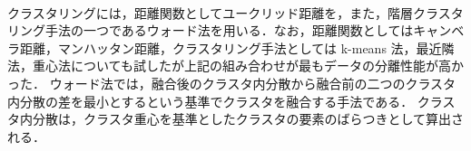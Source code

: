 \documentclass[technicalreport]{ieicej}
\begin{document}
\begin{table}[tb]
\begin{center}
\caption{主成分負荷量}
\label{comp-param}
~
\end{center}
\end{table}

クラスタリングには，距離関数としてユークリッド距離を，また，階層クラスタリング手法の一つであるウォード法\cite{murtagh2014ward}を用いる．なお，距離関数としてはキャンベラ距離，マンハッタン距離，クラスタリング手法としては k-means 法，最近隣法，重心法についても試したが上記の組み合わせが最もデータの分離性能が高かった．
ウォード法では，融合後のクラスタ内分散から融合前の二つのクラスタ内分散の差を最小とするという基準でクラスタを融合する手法である．
クラスタ内分散は，クラスタ重心を基準としたクラスタの要素のばらつきとして算出される．
\end{document}
